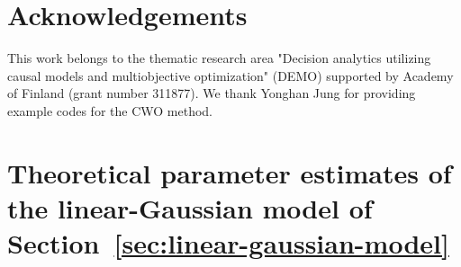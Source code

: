 \documentclass{statsoc}
\newcommand{\+}[1]{\ensuremath{\mathbf{#1}}}
\begin{document}
\section{Acknowledgements}

This work belongs to the thematic research area "Decision analytics utilizing causal models and multiobjective optimization" (DEMO) supported by Academy of Finland (grant number 311877). We thank Yonghan Jung for providing example codes for the CWO method.

\clearpage
\newpage

\appendix

\section{Theoretical parameter estimates of the linear-Gaussian model of Section~\ref{sec:linear-gaussian-model}}
\label{sec:appendix}
\end{document}
